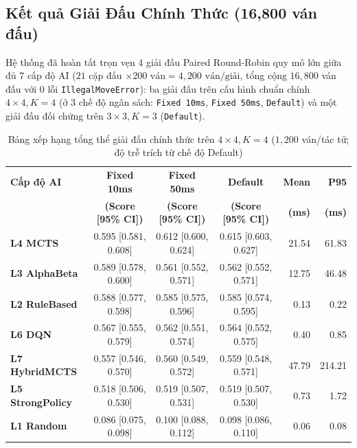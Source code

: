 \documentclass[a4paper,12pt]{report}
\begin{document}
\subsection{Kết quả Giải Đấu Chính Thức (16,800 ván đấu)}
Hệ thống đã hoàn tất trọn vẹn 4 giải đấu Paired Round-Robin quy mô lớn giữa đủ 7 cấp độ AI ($21$ cặp đấu $\times 200\text{ ván} = 4{,}200\text{ ván/giải}$, tổng cộng $16{,}800$ ván đấu với $0$ lỗi \texttt{IllegalMoveError}): ba giải đấu trên cấu hình chuẩn chính $4 \times 4, K=4$ (ở 3 chế độ ngân sách: \texttt{Fixed 10ms}, \texttt{Fixed 50ms}, \texttt{Default}) và một giải đấu đối chứng trên $3 \times 3, K=3$ (\texttt{Default}).

\begin{table}[H]
\centering
\footnotesize
\setlength{\tabcolsep}{4pt}
\caption{Bảng xếp hạng tổng thể giải đấu chính thức trên $4 \times 4, K=4$ ($1{,}200$ ván/tác tử; độ trễ trích từ chế độ Default)}
\label{tab:official_4x4}
\vspace{0.2cm}
\begin{tabular}{p{2.5cm}cccrr}
\toprule
\textbf{Cấp độ AI} & \textbf{Fixed 10ms} & \textbf{Fixed 50ms} & \textbf{Default} & \textbf{Mean} & \textbf{P95} \\
 & \textbf{(Score [95\% CI])} & \textbf{(Score [95\% CI])} & \textbf{(Score [95\% CI])} & \textbf{(ms)} & \textbf{(ms)} \\
\midrule
\textbf{L4 MCTS} & 0.595 [0.581, 0.608] & 0.612 [0.600, 0.624] & 0.615 [0.603, 0.627] & 21.54 & 61.83 \\
\textbf{L3 AlphaBeta} & 0.589 [0.578, 0.600] & 0.561 [0.552, 0.571] & 0.562 [0.552, 0.571] & 12.75 & 46.48 \\
\textbf{L2 RuleBased} & 0.588 [0.577, 0.598] & 0.585 [0.575, 0.596] & 0.585 [0.574, 0.595] & 0.13 & 0.22 \\
\textbf{L6 DQN} & 0.567 [0.555, 0.579] & 0.562 [0.551, 0.574] & 0.564 [0.552, 0.575] & 0.40 & 0.85 \\
\textbf{L7 HybridMCTS} & 0.557 [0.546, 0.570] & 0.560 [0.549, 0.572] & 0.559 [0.548, 0.571] & 47.79 & 214.21 \\
\textbf{L5 StrongPolicy} & 0.518 [0.506, 0.530] & 0.519 [0.507, 0.531] & 0.519 [0.507, 0.530] & 0.73 & 1.72 \\
\textbf{L1 Random} & 0.086 [0.075, 0.098] & 0.100 [0.088, 0.112] & 0.098 [0.086, 0.110] & 0.06 & 0.08 \\
\bottomrule
\end{tabular}
\end{table}
\end{document}

